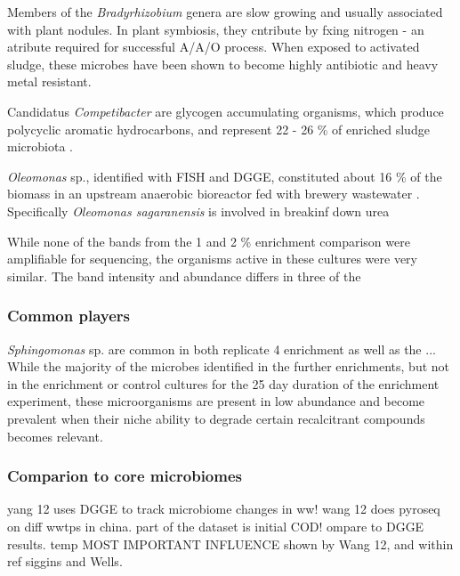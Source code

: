\documentclass[11pt]{article}
\begin{document}
Members of the \emph{Bradyrhizobium} genera are slow growing \cite{rebah2002wastewater} and usually associated with plant nodules. In plant symbiosis, they cntribute by fxing nitrogen - an atribute required for successful A/A/O process. When exposed to activated sludge, these microbes have been shown to become highly antibiotic and heavy metal resistant.

Candidatus \emph{Competibacter} are glycogen accumulating organisms, which produce polycyclic aromatic hydrocarbons, and represent 22 - 26 \% of enriched sludge microbiota \cite{bengtsson2008production,lemaire2008microbial}. 


\emph{Oleomonas} sp., identified with FISH and DGGE, constituted about 16 \% of the biomass in an upstream anaerobic bioreactor fed with brewery wastewater \cite{fernandez2008analysis}. Specifically \emph{Oleomonas sagaranensis} is involved in breakinf down urea \cite{kanamori2005allophanate,kanamori2004enzymatic}



While none of the bands from the 1 and 2 \% enrichment comparison were amplifiable for sequencing, the organisms active in these cultures were very similar. The band intensity and abundance differs in three of the 

\subsubsection{Common players}
\emph{Sphingomonas} sp. are common in both replicate 4 enrichment as well as the ...
While the majority of the microbes identified in the further enrichments, but not in the enrichment or control cultures for the 25 day duration of the enrichment experiment, these microorganisms are present in low abundance and become prevalent when their niche ability to degrade certain recalcitrant compounds becomes relevant.

\subsubsection{Comparion to core microbiomes}

yang 12 uses DGGE to track microbiome changes in ww!
wang 12 does pyroseq on diff wwtps in china. part of the dataset is initial COD! ompare to DGGE results. temp MOST IMPORTANT INFLUENCE shown by Wang 12, and within ref siggins and Wells.
\end{document}
